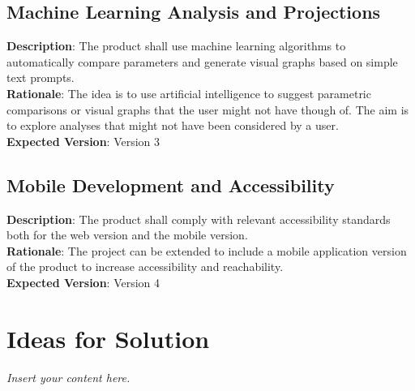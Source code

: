 \documentclass[12pt]{article}
\newcommand{\lips}{\textit{Insert your content here.}}
\begin{document}
\subsection{Machine Learning Analysis and Projections}
\textbf{Description}: The product shall use machine learning algorithms to
automatically compare parameters and generate visual graphs based on simple text
prompts.\\
\textbf{Rationale}: The idea is to use artificial intelligence to suggest
parametric comparisons or visual graphs that the user might not have though of.
The aim is to explore analyses that might not have been considered by a user.\\
\textbf{Expected Version}: Version 3

\subsection{Mobile Development and Accessibility}
\textbf{Description}: The product shall comply with relevant accessibility
standards both for the web version and the mobile version.\\
\textbf{Rationale}: The project can be extended to include a mobile application
version of the product to increase accessibility and reachability.\\
\textbf{Expected Version}: Version 4

\section{Ideas for Solution}
\lips

\newpage{}
\end{document}
